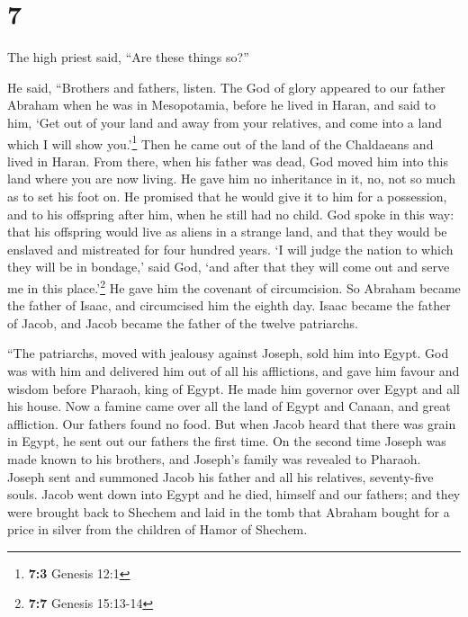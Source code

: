 \hypertarget{section-6}{%
\section{7}\label{section-6}}

 The high priest said, ``Are these things so?''

 He said, ``Brothers and fathers, listen. The God of glory
appeared to our father Abraham when he was in Mesopotamia, before he
lived in Haran,  and said to him, `Get out of your land
and away from your relatives, and come into a land which I will show
you.'\footnote{\textbf{7:3} Genesis 12:1}  Then he came
out of the land of the Chaldaeans and lived in Haran. From there, when
his father was dead, God moved him into this land where you are now
living.  He gave him no inheritance in it, no, not so much
as to set his foot on. He promised that he would give it to him for a
possession, and to his offspring after him, when he still had no child.
 God spoke in this way: that his offspring would live as
aliens in a strange land, and that they would be enslaved and mistreated
for four hundred years.  `I will judge the nation to which
they will be in bondage,' said God, `and after that they will come out
and serve me in this place.'\footnote{\textbf{7:7} Genesis 15:13-14}
 He gave him the covenant of circumcision. So Abraham
became the father of Isaac, and circumcised him the eighth day. Isaac
became the father of Jacob, and Jacob became the father of the twelve
patriarchs.

 ``The patriarchs, moved with jealousy against Joseph,
sold him into Egypt. God was with him  and delivered him
out of all his afflictions, and gave him favour and wisdom before
Pharaoh, king of Egypt. He made him governor over Egypt and all his
house.  Now a famine came over all the land of Egypt and
Canaan, and great affliction. Our fathers found no food. 
But when Jacob heard that there was grain in Egypt, he sent out our
fathers the first time.  On the second time Joseph was
made known to his brothers, and Joseph's family was revealed to Pharaoh.
 Joseph sent and summoned Jacob his father and all his
relatives, seventy-five souls.  Jacob went down into
Egypt and he died, himself and our fathers;  and they
were brought back to Shechem and laid in the tomb that Abraham bought
for a price in silver from the children of Hamor of Shechem.

